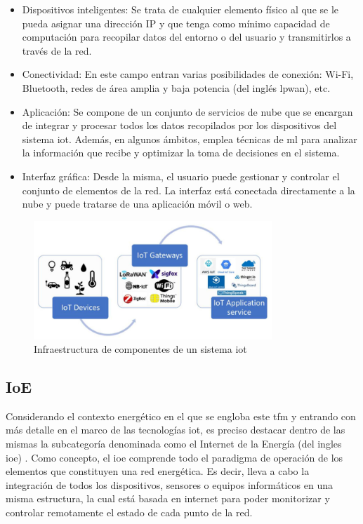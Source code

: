 \begin{itemize}
    \item Dispositivos inteligentes: Se trata de cualquier elemento físico al que se le pueda asignar una dirección IP y que tenga como mínimo capacidad de computación para recopilar datos del entorno o del usuario y transmitirlos a través de la red. 
    \item Conectividad: En este campo entran varias posibilidades de conexión: Wi-Fi, Bluetooth, redes de área amplia y baja potencia (del inglés \gls{lpwan}), etc.
    \item Aplicación: Se compone de un conjunto de servicios de nube que se encargan de integrar y procesar todos los datos recopilados por los dispositivos del sistema \gls{iot}. Además, en algunos ámbitos, emplea técnicas de \gls{ml} para analizar la información que recibe y optimizar la toma de decisiones en el sistema.
    \item Interfaz gráfica: Desde la misma, el usuario puede gestionar y controlar el conjunto de elementos de la red. La interfaz está conectada directamente a la nube y puede tratarse de una aplicación móvil o web.
\end{itemize}

\begin{figure}[h!]
    \centering
    \includegraphics[width=0.8\textwidth]{img/teoria/iot.png}
    \caption{Infraestructura de componentes de un sistema \acrshort{iot} \cite{iotscheme}}
    \label{fig:iot}
\end{figure}

\subsection{IoE}
\label{sec:ioe}

Considerando el contexto energético en el que se engloba este \gls{tfm} y entrando con más detalle en el marco de las tecnologías \gls{iot}, es preciso destacar dentro de las mismas la subcategoría denominada como el Internet de la Energía (del ingles \gls{ioe}) \cite{ioe}. Como concepto, el \gls{ioe} comprende todo el paradigma de operación de los elementos que constituyen una red energética. Es decir, lleva a cabo la integración de todos los dispositivos, sensores o equipos informáticos en una misma estructura, la cual está basada en internet para poder monitorizar y controlar remotamente el estado de cada punto de la red.

